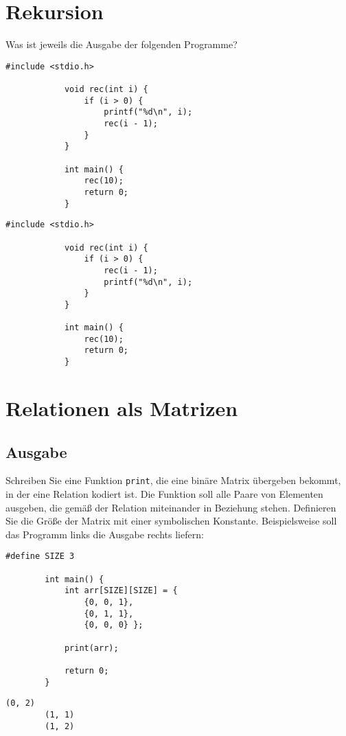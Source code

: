 \documentclass[a4paper]{article}
\begin{document}
	\section{Rekursion}
	
	Was ist jeweils die Ausgabe der folgenden Programme?
	
	\noindent
	\begin{minipage}[t]{0.5\linewidth} %
		\begin{lstlisting}[gobble=6]
			#include <stdio.h>
			
			void rec(int i) {
				if (i > 0) {
					printf("%d\n", i);
					rec(i - 1);
				}
			}
			
			int main() {
				rec(10);
				return 0;
			}
		\end{lstlisting}
	\end{minipage}
	\quad
	\begin{minipage}[t]{0.5\linewidth} %
		\begin{lstlisting}[gobble=6]
			#include <stdio.h>
			
			void rec(int i) {
				if (i > 0) {
					rec(i - 1);
					printf("%d\n", i);
				}
			}
			
			int main() {
				rec(10);
				return 0;
			}
		\end{lstlisting}
	\end{minipage}
	
	\section{Relationen als Matrizen}
	
	\subsection{Ausgabe}
	
	Schreiben Sie eine Funktion \texttt{print}, die eine binäre Matrix übergeben bekommt, in der eine Relation kodiert ist.
	Die Funktion soll alle Paare von Elementen ausgeben, die gemäß der Relation miteinander in Beziehung stehen.
	Definieren Sie die Größe der Matrix mit einer symbolischen Konstante.
	Beispielsweise soll das Programm links die Ausgabe rechts liefern:
	
	\noindent\begin{minipage}[t][][b]{0.6\linewidth}
	\begin{lstlisting}[gobble=4]
		#define SIZE 3
		
		int main() {
			int arr[SIZE][SIZE] = { 
				{0, 0, 1},
				{0, 1, 1},
				{0, 0, 0} };
				
			print(arr);
			
			return 0;
		}
	\end{lstlisting}
	\end{minipage}\qquad
	\begin{minipage}[t][][b]{0.3\linewidth}
	\begin{lstlisting}[gobble=4]
		(0, 2)
		(1, 1)
		(1, 2)
	\end{lstlisting}
	\end{minipage}
	
\end{document}
